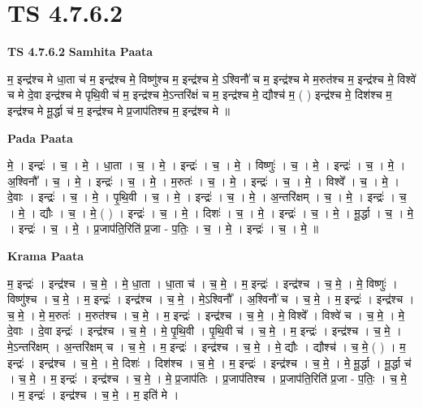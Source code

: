 \documentclass[17pt]{extarticle}
\begin{document}
\section{ TS 4.7.6.2 }

\textbf{TS 4.7.6.2 } \newline
\textbf{Samhita Paata} \newline

म॒ इन्द्र॑श्च मे धा॒ता च॑ म॒ इन्द्र॑श्च मे॒ विष्णु॑श्च म॒ इन्द्र॑श्च मे॒ ऽश्विनौ॑ च म॒ इन्द्र॑श्च मे म॒रुत॑श्च म॒ इन्द्र॑श्च मे॒ विश्वे॑ च मे दे॒वा इन्द्र॑श्च मे   पृथि॒वी च॑ म॒ इन्द्र॑श्च मे॒ऽन्तरि॑क्षं च म॒ इन्द्र॑श्च मे॒ द्यौश्च॑ म॒ ( ) इन्द्र॑श्च मे॒ दिश॑श्च म॒ इन्द्र॑श्च मे                मू॒र्द्धा च॑ म॒ इन्द्र॑श्च मे प्र॒जाप॑तिश्च म॒ इन्द्र॑श्च मे ॥ \newline

\textbf{Pada Paata} \newline

मे॒ । इन्द्रः॑ । च॒ । मे॒ । धा॒ता । च॒ । मे॒ । इन्द्रः॑ । च॒ । मे॒ । विष्णुः॑ । च॒ । मे॒ । इन्द्रः॑ । च॒ । मे॒ । अ॒श्विनौ᳚ । च॒ । मे॒ । इन्द्रः॑ । च॒ । मे॒ । म॒रुतः॑ । च॒ । मे॒ । इन्द्रः॑ । च॒ । मे॒ । विश्वे᳚ । च॒ । मे॒ । दे॒वाः । इन्द्रः॑ । च॒ । मे॒ । पृ॒थि॒वी । च॒ । मे॒ । इन्द्रः॑ । च॒ । मे॒ । अ॒न्तरि॑क्षम् । च॒ । मे॒ । इन्द्रः॑ । च॒ । मे॒ । द्यौः । च॒ । मे॒ ( ) । इन्द्रः॑ । च॒ । मे॒ । दिशः॑ । च॒ । मे॒ । इन्द्रः॑ । च॒ । मे॒ । मू॒र्द्धा । च॒ । मे॒ । इन्द्रः॑ । च॒ । मे॒ । प्र॒जाप॑ति॒रिति॑ प्र॒जा - प॒तिः॒ । च॒ । मे॒ । इन्द्रः॑ । च॒ । मे॒ ॥  \newline


\textbf{Krama Paata} \newline

म॒ इन्द्रः॑ । इन्द्र॑श्च । च॒ मे॒ । मे॒ धा॒ता । धा॒ता च॑ । च॒ मे॒ । म॒ इन्द्रः॑ । इन्द्र॑श्च । च॒ मे॒ । मे॒ विष्णुः॑ । विष्णु॑श्च । च॒ मे॒ । म॒ इन्द्रः॑ । इन्द्र॑श्च । च॒ मे॒ । मे॒ऽश्विनौ᳚ । अ॒श्विनौ॑ च । च॒ मे॒ । म॒ इन्द्रः॑ । इन्द्र॑श्च । च॒ मे॒ । मे॒ म॒रुतः॑ । म॒रुत॑श्च । च॒ मे॒ । म॒ इन्द्रः॑ । इन्द्र॑श्च । च॒ मे॒ । मे॒ विश्वे᳚ । विश्वे॑ च । च॒ मे॒ । मे॒ दे॒वाः । दे॒वा इन्द्रः॑ । इन्द्र॑श्च । च॒ मे॒ । मे॒ पृ॒थि॒वी । पृ॒थि॒वी च॑ । च॒ मे॒ । म॒ इन्द्रः॑ । इन्द्र॑श्च । च॒ मे॒ । मे॒ऽन्तरि॑क्षम् । अ॒न्तरि॑क्षम् च । च॒ मे॒ । म॒ इन्द्रः॑ । इन्द्र॑श्च । च॒ मे॒ । मे॒ द्यौः । द्यौश्च॑ । च॒ मे॒ ( ) । म॒ इन्द्रः॑ । इन्द्र॑श्च । च॒ मे॒ । मे॒ दिशः॑ । दिश॑श्च । च॒ मे॒ । म॒ इन्द्रः॑ । इन्द्र॑श्च । च॒ मे॒ । मे॒ मू॒र्द्धा । मू॒र्द्धा च॑ । च॒ मे॒ । म॒ इन्द्रः॑ । इन्द्र॑श्च । च॒ मे॒ । मे॒ प्र॒जाप॑तिः । प्र॒जाप॑तिश्च । प्र॒जाप॑ति॒रिति॑ प्र॒जा - प॒तिः॒ । च॒ मे॒ । म॒ इन्द्रः॑ । इन्द्र॑श्च । च॒ मे॒ । म॒ इति॑ मे । \newline
\end{document}
